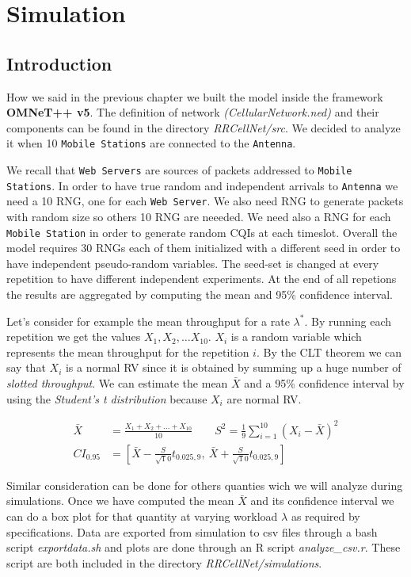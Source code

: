 \chapter{Simulation}

\section{Introduction}
How we said in the previous chapter we built the model inside the framework \textbf{OMNeT++ v5}. The definition of network \textit{(CellularNetwork.ned)} and their components can be found in the directory \textit{RRCellNet/src}. We decided to analyze it when 10 \texttt{Mobile Stations} are connected to the \texttt{Antenna}.

We recall that \texttt{Web Servers} are sources of packets addressed to \texttt{Mobile Stations}. In order to have true random and independent arrivals to \texttt{Antenna} we need a 10 RNG, one for each \texttt{Web Server}. We also need RNG to generate packets with random size so others 10 RNG are neeeded. We need also a RNG for each \texttt{Mobile Station} in order to generate random CQIs at each timeslot. Overall the model requires 30 RNGs each of them initialized with a different seed in order to have independent pseudo-random variables. The seed-set is changed at every repetition to have different independent experiments. At the end of all repetions the results are aggregated by computing the mean and 95\% confidence interval. 

Let's consider for example the mean throughput for a rate \(\lambda^{*}\). By running each repetition we get the values \(X_{1},X_{2},\ldots X_{10}\). \(X_{i}\) is a random variable which represents the mean throughput for the repetition \(i\). By the CLT theorem we can say that \(X_{i}\) is a normal RV since it is obtained by summing up a huge number of \textit{slotted throughput}. We can estimate the mean \(\bar{X}\) and a 95\% confidence interval by using the \textit{Student's t distribution} because \(X_{i}\) are normal RV. 

\begin{align}
	\bar{X} &= \frac{X_{1}+X_{2}+\ldots+X_{10}}{10} \qquad S^{2} = \frac{1}{9}\sum_{i=1}^{10}(X_{i} - \bar{X})^{2} \\
	CI_{0.95} &= \left[\bar{X} - \frac{S}{\sqrt10}t_{0.025,9}, \: \bar{X} + \frac{S}{\sqrt10}t_{0.025,9}\right]
\end{align}

Similar consideration can be done for others quanties wich we will analyze during simulations. Once we have computed the mean \(\bar{X}\) and its confidence interval we can do a box plot for that quantity at varying workload \(\lambda\) as required by specifications. Data are exported from simulation to csv files through a bash script \textit{exportdata.sh} and plots are done through an R script \textit{analyze\_csv.r}. These script are both included in the directory \textit{RRCellNet/simulations}.

